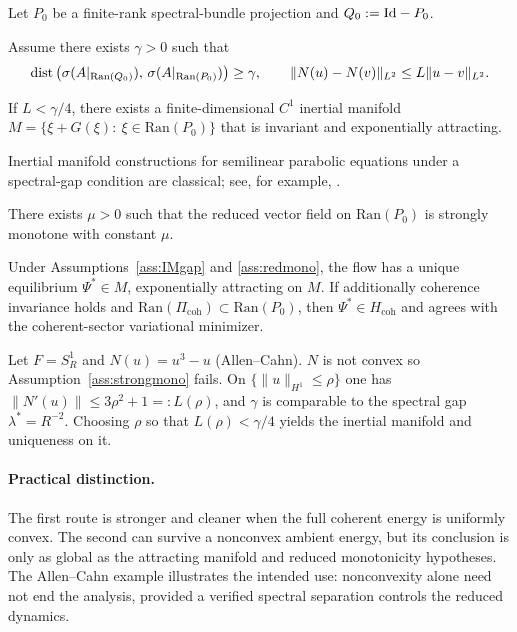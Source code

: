 \documentclass[11pt]{article}
\providecommand{\PiCoh}{\Pi_{\mathrm{coh}}}
\providecommand{\Hcoh}{H_{\mathrm{coh}}}
\providecommand{\Aop}{A}
\providecommand{\Ran}{\mathrm{Ran}}
\providecommand{\spec}{\sigma}
\providecommand{\lamstar}{\ensuremath{\lambda^{\ast}}}
\begin{document}
Let $P_0$ be a finite-rank spectral-bundle projection and $Q_0:=\mathrm{Id}-P_0$.

\begin{assumption}\label{ass:IMgap}
Assume there exists $\gamma>0$ such that
\[
\dist\big(\spec(\Aop|_{\Ran(Q_0)}),\,\spec(\Aop|_{\Ran(P_0)})\big)\ge \gamma,
\qquad
\|N(u)-N(v)\|_{L^2}\le L\|u-v\|_{L^2}.
\]
\end{assumption}

\begin{theorem}\label{thm:IM}
If $L<\gamma/4$, there exists a finite-dimensional $C^1$ inertial manifold
$M=\{\xi+G(\xi):\ \xi\in\Ran(P_0)\}$ that is invariant and exponentially attracting.
\end{theorem}

\begin{remark}[References]
Inertial manifold constructions for semilinear parabolic equations under a spectral-gap condition are classical; see, for example, \cite{Temam1997,Henry1981}.
\end{remark}

\begin{assumption}\label{ass:redmono}
There exists $\mu>0$ such that the reduced vector field on $\Ran(P_0)$ is strongly monotone with constant $\mu$.
\end{assumption}

\begin{theorem}\label{thm:IMunique}
Under Assumptions~\ref{ass:IMgap} and \ref{ass:redmono}, the flow has a unique equilibrium $\Psi^\ast\in M$,
exponentially attracting on $M$.
If additionally coherence invariance holds and $\Ran(\PiCoh)\subset \Ran(P_0)$, then $\Psi^\ast\in \Hcoh$ and agrees with the coherent-sector variational minimizer.
\end{theorem}

\begin{example}
Let $F=S^1_R$ and $N(u)=u^3-u$ (Allen--Cahn). $N$ is not convex so Assumption~\ref{ass:strongmono} fails.
On $\{\|u\|_{H^1}\le \rho\}$ one has $\|N'(u)\|\le 3\rho^2+1=:L(\rho)$, and $\gamma$ is comparable to the spectral gap $\lamstar=R^{-2}$.
Choosing $\rho$ so that $L(\rho)<\gamma/4$ yields the inertial manifold and uniqueness on it.
\end{example}

\paragraph{Practical distinction.}
The first route is stronger and cleaner when the full coherent energy is
uniformly convex.  The second can survive a nonconvex ambient energy, but its
conclusion is only as global as the attracting manifold and reduced
monotonicity hypotheses.  The Allen--Cahn example illustrates the intended
use: nonconvexity alone need not end the analysis, provided a verified
spectral separation controls the reduced dynamics.
\end{document}
